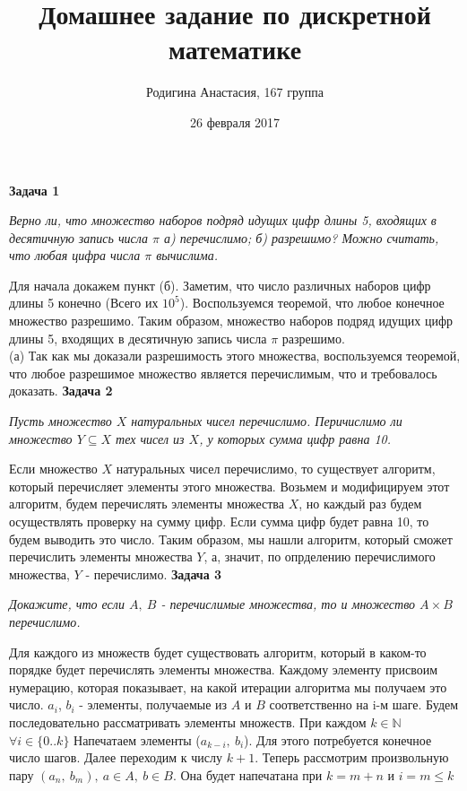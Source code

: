 \documentclass{article}
\title{Домашнее задание по дискретной математике}
\author{Родигина Анастасия, 167 группа}
\date{26 февраля  2017}
\begin{document}
            

\maketitle  
 \noindent \textbf{Задача 1}
\begin{center} 
\textit{Верно ли, что множество наборов подряд идущих цифр длины 5, входящих в десятичную запись числа $\pi$ а) перечислимо; б) разрешимо? Можно считать, что любая цифра числа $\pi$ вычислима.}
\end{center}
Для начала докажем пункт (б). Заметим, что число различных наборов цифр длины 5 конечно (Всего их $10^5$). Воспользуемся теоремой, что любое конечное множество разрешимо. 
Таким образом, множество наборов подряд идущих цифр длины 5, входящих в десятичную запись числа $\pi$ разрешимо.\\
(а) Так как мы доказали разрешимость этого множества, воспользуемся теоремой, что любое разрешимое множество является перечислимым, что и требовалось доказать.
\newline
\newline
\textbf{Задача 2}
\begin{center}
\textit{Пусть множество $X$ натуральных чисел перечислимо. Перичислимо ли множество $Y \subseteq X$ тех чисел из $X$, у которых сумма цифр равна 10.}
\end{center}
Если множество $X$ натуральных чисел перечислимо, то существует алгоритм, который перечисляет элементы этого множества. Возьмем и модифицируем этот  алгоритм, будем перечислять элементы множества $X$, но каждый раз будем осуществлять проверку на сумму цифр. Если сумма цифр будет равна 10, то будем выводить это число. Таким образом, мы нашли алгоритм, который сможет перечислить элементы множества $Y$, а, значит, по опрделению перечислимого множества, $Y$ - перечислимо. 
 \newline
 \newline
\textbf{Задача 3}
\begin{center}
\textit{Докажите, что если $A,~B$ - перечислимые множества, то и множество $A\times B$ перечислимо.} 
\end{center}
Для каждого из множеств будет существовать алгоритм, который в каком-то порядке будет перечислять элементы множества. Каждому элементу присвоим нумерацию, которая показывает, на какой итерации алгоритма мы получаем это число. $a_i$,
$b_i$ - элементы, получаемые из $A$ и $B$ соответственно на i-м шаге. Будем последовательно рассматривать элементы множеств. При каждом $k \in \mathbb{N}$ $\forall i \in \{0..k\}$ Напечатаем элементы ($a_{k-i},~b_i$). Для этого потребуется конечное число шагов. Далее переходим к числу $k+1$. Теперь рассмотрим произвольную пару $(a_n,~b_m),~a \in A,~ b\in B$. Она будет напечатана при $k=m+n$ и $i=m \leq k$
\end{document}
